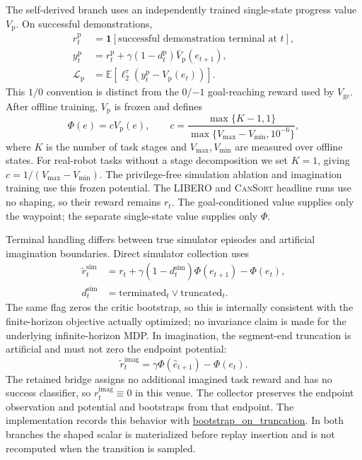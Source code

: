 \documentclass[letterpaper]{article} %
\begin{document}
The self-derived branch uses an independently trained single-state progress
value $V_{\mathrm p}$. On successful demonstrations,
\[
\begin{aligned}
r_t^{\mathrm p}
&=\mathbf 1[\text{successful demonstration terminal at }t],\\
y_t^{\mathrm p}
&=r_t^{\mathrm p}
 +\gamma(1-d_t^{\mathrm p})\bar V_{\mathrm p}(e_{t+1}),\\
\mathcal L_{\mathrm p}
&=\mathbb E\!\left[
 \ell_2^\tau\!\left(
 y_t^{\mathrm p}-V_{\mathrm p}(e_t)
 \right)\right].
\end{aligned}
\]
This $1/0$ convention is distinct from the $0/{-1}$ goal-reaching reward used
by $V_{\mathrm{gc}}$. After offline training, $V_{\mathrm p}$ is frozen and
defines
\[
\Phi(e)=cV_{\mathrm p}(e),\qquad
c=\frac{\max\{K-1,1\}}
{\max\{V_{\max}-V_{\min},10^{-6}\}},
\]
where $K$ is the number of task stages and $V_{\max},V_{\min}$ are measured
over offline states. For real-robot tasks without a stage decomposition we set
$K=1$, giving $c=1/(V_{\max}-V_{\min})$. The privilege-free simulation
ablation and imagination training use this frozen potential. The LIBERO and
\textsc{CanSort} headline runs use no shaping, so their reward remains $r_t$.
The goal-conditioned value supplies only the waypoint; the separate
single-state value supplies only $\Phi$.

Terminal handling differs between true simulator episodes and artificial
imagination boundaries. Direct simulator collection uses
\[
\begin{aligned}
\widetilde r_t^{\mathrm{sim}}
&=r_t+\gamma(1-d_t^{\mathrm{sim}})\Phi(e_{t+1})-\Phi(e_t),\\
d_t^{\mathrm{sim}}
&=\mathrm{terminated}_t\lor\mathrm{truncated}_t.
\end{aligned}
\]
The same flag zeros the critic bootstrap, so this is internally consistent
with the finite-horizon objective actually optimized; no invariance claim is
made for the underlying infinite-horizon MDP. In imagination, the segment-end
truncation is artificial and must not zero the endpoint potential:
\[
\widetilde r_t^{\mathrm{imag}}
=\gamma\Phi(\widehat e_{t+1})-\Phi(e_t).
\]
The retained bridge assigns no additional imagined task reward and has no
success classifier, so $r_t^{\mathrm{imag}}\equiv0$ in this venue.
The collector preserves the endpoint observation and potential and bootstraps
from that endpoint. The implementation records this behavior with
\url{bootstrap_on_truncation}. In both
branches the shaped scalar is materialized before replay insertion and is not
recomputed when the transition is sampled.
\end{document}
